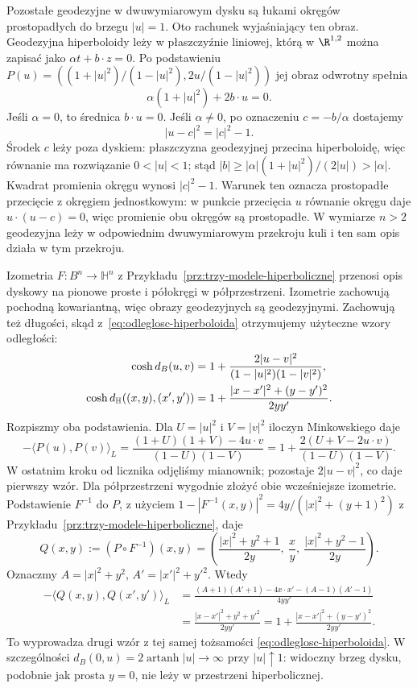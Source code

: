 \begin{przyklad}
Pozostałe geodezyjne w dwuwymiarowym dysku są
łukami okręgów prostopadłych do brzegu $|u|=1$.
Oto rachunek wyjaśniający ten obraz. Geodezyjna
hiperboloidy leży w płaszczyźnie liniowej, którą
w $\R^{1,2}$ można zapisać jako
$\alpha t+b\cdot z=0$. Po podstawieniu
$P(u)=((1+|u|^2)/(1-|u|^2),2u/(1-|u|^2))$
jej obraz odwrotny spełnia
\[
 \alpha(1+|u|^2)+2b\cdot u=0.
\]
Jeśli $\alpha=0$, to średnica $b\cdot u=0$.
Jeśli $\alpha\ne0$, po oznaczeniu $c=-b/\alpha$
dostajemy
\begin{equation}\label{eq:geodezyjna-dysk-okrag}
 |u-c|^2=|c|^2-1.
\end{equation}
Środek $c$ leży poza dyskiem: płaszczyzna geodezyjnej
przecina hiperboloidę, więc równanie ma rozwiązanie
$0<|u|<1$; stąd
$|b|\geq |\alpha|(1+|u|^2)/(2|u|)>|\alpha|$.
Kwadrat promienia
okręgu wynosi $|c|^2-1$. Warunek ten oznacza
prostopadłe przecięcie z okręgiem jednostkowym:
w punkcie przecięcia $u$ równanie okręgu daje
$u\cdot(u-c)=0$, więc promienie obu okręgów
są prostopadłe. W wymiarze $n>2$ geodezyjna
leży w odpowiednim dwuwymiarowym przekroju
kuli i ten sam opis działa w tym przekroju.

Izometria $F:B^n\to\mathbb H^n$ z
Przykładu~\ref{prz:trzy-modele-hiperboliczne}
przenosi opis dyskowy na pionowe proste
i półokręgi w półprzestrzeni. Izometrie
zachowują pochodną kowariantną, więc obrazy
geodezyjnych są geodezyjnymi. Zachowują też
długości, skąd z~\eqref{eq:odleglosc-hiperboloida}
otrzymujemy użyteczne wzory odległości:
\begin{align}\label{eq:odleglosci-modele-hiperboliczne}
 \cosh d_B(u,v)
  &=1+\frac{2|u-v|^2}
      {(1-|u|^2)(1-|v|^2)},\\
 \cosh d_{\mathbb H}((x,y),(x',y'))
  &=1+\frac{|x-x'|^2+(y-y')^2}{2yy'}.\notag
\end{align}
Rozpiszmy oba podstawienia. Dla $U=|u|^2$ i $V=|v|^2$
iloczyn Minkowskiego daje
\[
 -\langle P(u),P(v)\rangle_L
 =\frac{(1+U)(1+V)-4u\cdot v}{(1-U)(1-V)}
 =1+\frac{2(U+V-2u\cdot v)}{(1-U)(1-V)}.
\]
W ostatnim kroku od licznika odjęliśmy mianownik;
pozostaje $2|u-v|^2$, co daje pierwszy wzór.
Dla półprzestrzeni wygodnie złożyć obie wcześniejsze
izometrie. Podstawienie $F^{-1}$ do $P$, z użyciem
$1-|F^{-1}(x,y)|^2=4y/(|x|^2+(y+1)^2)$ z
Przykładu~\ref{prz:trzy-modele-hiperboliczne}, daje
\[
 Q(x,y):=(P\circ F^{-1})(x,y)
 =\left(\frac{|x|^2+y^2+1}{2y},\
         \frac{x}{y},\
         \frac{|x|^2+y^2-1}{2y}\right).
\]
Oznaczmy $A=|x|^2+y^2$, $A'=|x'|^2+y'^2$.
Wtedy
\[
 \begin{aligned}
 -\langle Q(x,y),Q(x',y')\rangle_L
 &=\frac{(A+1)(A'+1)-4x\cdot x'-(A-1)(A'-1)}{4yy'}\\
 &=\frac{|x-x'|^2+y^2+y'^2}{2yy'}
 =1+\frac{|x-x'|^2+(y-y')^2}{2yy'}.
 \end{aligned}
\]
To wyprowadza drugi wzór z tej samej
tożsamości \eqref{eq:odleglosc-hiperboloida}.
W szczególności
$d_B(0,u)=2\operatorname{artanh}|u|\to\infty$
przy $|u|\uparrow1$: widoczny brzeg dysku,
podobnie jak prosta $y=0$, nie leży w przestrzeni
hiperbolicznej.
\end{przyklad}

